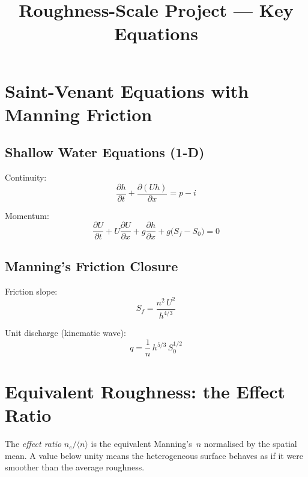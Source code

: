 \documentclass[11pt]{article}
\title{Roughness-Scale Project --- Key Equations}
\author{}
\date{}
\newcommand{\avg}[1]{\langle #1 \rangle}
\newcommand{\neff}{n_e}
\newcommand{\Sf}{S_f}
\newcommand{\So}{S_0}
\begin{document}
\maketitle

\section{Saint-Venant Equations with Manning Friction}

\subsection{Shallow Water Equations (1-D)}

Continuity:
\begin{equation}\label{eq:continuity}
  \frac{\partial h}{\partial t} + \frac{\partial (Uh)}{\partial x} = p - i
\end{equation}

Momentum:
\begin{equation}\label{eq:momentum}
  \frac{\partial U}{\partial t} + U\frac{\partial U}{\partial x}
  + g\frac{\partial h}{\partial x} + g\bigl(\Sf - \So\bigr) = 0
\end{equation}

\subsection{Manning's Friction Closure}

Friction slope:
\begin{equation}\label{eq:Sf}
  \Sf = \frac{n^2\, U^2}{h^{4/3}}
\end{equation}

Unit discharge (kinematic wave):
\begin{equation}\label{eq:q}
  q = \frac{1}{n}\, h^{5/3}\, \So^{1/2}
\end{equation}


\section{Equivalent Roughness: the Effect Ratio}

The \emph{effect ratio} $\neff/\avg{n}$ is the equivalent Manning's~$n$ normalised by the spatial mean.
A value below unity means the heterogeneous surface behaves as if it were smoother than the average roughness.
\end{document}
